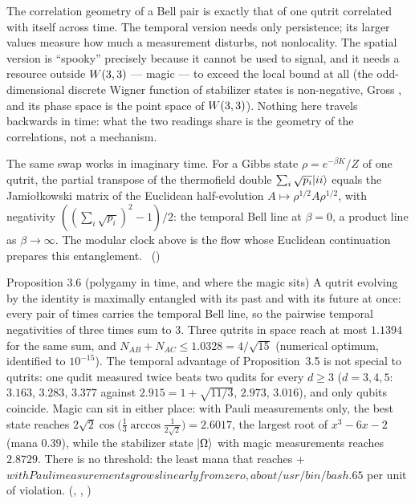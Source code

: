 \begin{physical}
The correlation geometry of a Bell pair is exactly that of one qutrit correlated with itself across time. The temporal
version needs only persistence; its larger values measure how much a measurement disturbs, not nonlocality. The
spatial version is ``spooky'' precisely because it cannot be used to signal, and it needs a resource outside $W(3,3)$ ---
magic --- to exceed the local bound at all (the odd-dimensional discrete Wigner function of stabilizer states is
non-negative, Gross \cite{Gross2006}, and its phase space is the point space of $W(3,3)$). Nothing here travels backwards in
time: what the two readings share is the geometry of the correlations, not a mechanism.
\end{physical}

The same swap works in imaginary time. For a Gibbs state $\rho=e^{-\beta K}/Z$ of one qutrit, the partial transpose of
the thermofield double $\sum_i\sqrt{p_i}\lvert ii\rangle$ equals the Jamio{\l}kowski matrix of the Euclidean half-evolution
$A\mapsto\rho^{1/2}A\rho^{1/2}$, with negativity $((\sum_i\sqrt{p_i})^2-1)/2$: the temporal Bell line at $\beta=0$, a
product line as $\beta\to\infty$. The modular clock above is the flow whose Euclidean continuation prepares this
entanglement. \tierC\ ()

\begin{result}{Proposition 3.6 (polygamy in time, and where the magic sits) \hfill \tierC}
A qutrit evolving by the identity is maximally entangled with its past and with its future at once: every pair of times
carries the temporal Bell line, so the pairwise temporal negativities of three times sum to $3$. Three qutrits in space
reach at most $1.1394$ for the same sum, and $N_{AB}+N_{AC}\le 1.0328=4/\sqrt{15}$ (numerical optimum, identified to
$10^{-15}$). The temporal advantage of Proposition~3.5 is not special to qutrits: one qudit measured twice beats two
qudits for every $d\ge3$ ($d=3,4,5$: $3.163$, $3.283$, $3.377$ against $2.915=1+\sqrt{11/3}$, $2.973$, $3.016$),
and only qubits coincide. Magic can sit in either place: with Pauli measurements only, the best state reaches
$2\sqrt2\cos\!\bigl(\tfrac13\arccos\tfrac1{2\sqrt2}\bigr)=2.6017$, the largest root of $x^3-6x-2$ (mana $0.39$), while
the stabilizer state $\lvert \Omega\rangle$ with magic measurements reaches $2.8729$. There is no threshold: the least mana that reaches +\varepsilon$ with Pauli measurements grows linearly from zero, about /usr/bin/bash.65$ per unit of violation. \tierC
(, ,
)
\end{result}

